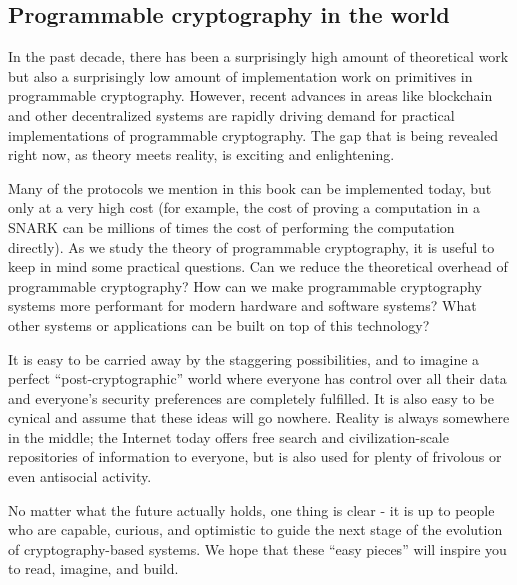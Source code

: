 \subsection{Programmable cryptography in the world}

In the past decade, there has been a surprisingly high amount of
theoretical work but also a surprisingly low amount of implementation
work on primitives in programmable cryptography. However, recent
advances in areas like blockchain and other decentralized systems are
rapidly driving demand for practical implementations of programmable
cryptography. The gap that is being revealed right now, as theory meets
reality, is exciting and enlightening.

Many of the protocols we mention in this book can be implemented today,
but only at a very high cost (for example, the cost of proving a
computation in a SNARK can be millions of times the cost of performing
the computation directly). As we study the theory of programmable
cryptography, it is useful to keep in mind some practical questions. Can
we reduce the theoretical overhead of programmable cryptography? How can
we make programmable cryptography systems more performant for modern
hardware and software systems? What other systems or applications can be
built on top of this technology?

It is easy to be carried away by the staggering possibilities, and to
imagine a perfect ``post-cryptographic'' world where everyone has
control over all their data and everyone's security preferences are
completely fulfilled. It is also easy to be cynical and assume that
these ideas will go nowhere. Reality is always somewhere in the middle;
the Internet today offers free search and civilization-scale
repositories of information to everyone, but is also used for plenty of
frivolous or even antisocial activity.

No matter what the future actually holds, one thing is clear - it is up
to people who are capable, curious, and optimistic to guide the next
stage of the evolution of cryptography-based systems. We hope that these
``easy pieces'' will inspire you to read, imagine, and build.
